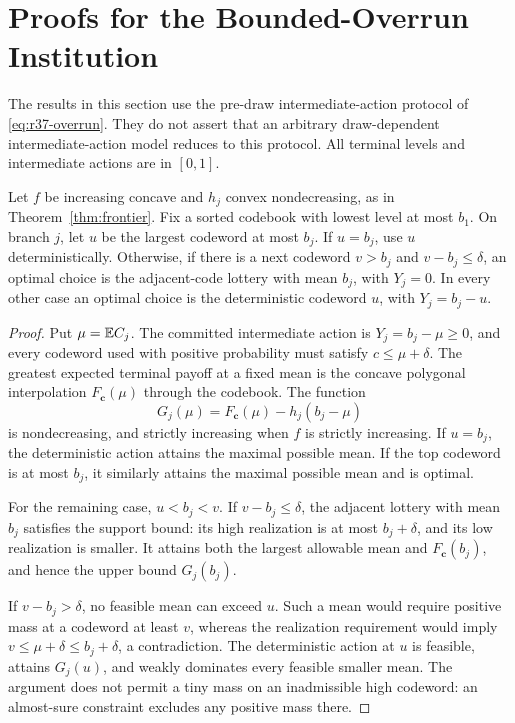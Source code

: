 \section{Proofs for the Bounded-Overrun Institution}\label{ec:r37-overrun}
The results in this section use the pre-draw intermediate-action protocol of \eqref{eq:r37-overrun}. They do not assert that an arbitrary draw-dependent intermediate-action model reduces to this protocol. All terminal levels and intermediate actions are in $[0,1]$.

\begin{proposition}\label{prop:r37-fixed-overrun}
Let $f$ be increasing concave and $h_j$ convex nondecreasing, as in Theorem~\ref{thm:frontier}. Fix a sorted codebook with lowest level at most $b_1$. On branch $j$, let $u$ be the largest codeword at most $b_j$. If $u=b_j$, use $u$ deterministically. Otherwise, if there is a next codeword $v>b_j$ and $v-b_j\leq\delta$, an optimal choice is the adjacent-code lottery with mean $b_j$, with $Y_j=0$. In every other case an optimal choice is the deterministic codeword $u$, with $Y_j=b_j-u$.
\end{proposition}
\begin{proof}
Put $\mu=\mathbb E C_j$. The committed intermediate action is $Y_j=b_j-\mu\geq0$, and every codeword used with positive probability must satisfy $c\leq\mu+\delta$. The greatest expected terminal payoff at a fixed mean is the concave polygonal interpolation $F_{\boldsymbol c}(\mu)$ through the codebook. The function
\[
 G_j(\mu)=F_{\boldsymbol c}(\mu)-h_j(b_j-\mu)
\]
is nondecreasing, and strictly increasing when $f$ is strictly increasing. If $u=b_j$, the deterministic action attains the maximal possible mean. If the top codeword is at most $b_j$, it similarly attains the maximal possible mean and is optimal.

For the remaining case, $u<b_j<v$. If $v-b_j\leq\delta$, the adjacent lottery with mean $b_j$ satisfies the support bound: its high realization is at most $b_j+\delta$, and its low realization is smaller. It attains both the largest allowable mean and $F_{\boldsymbol c}(b_j)$, and hence the upper bound $G_j(b_j)$.

If $v-b_j>\delta$, no feasible mean can exceed $u$. Such a mean would require positive mass at a codeword at least $v$, whereas the realization requirement would imply $v\leq\mu+\delta\leq b_j+\delta$, a contradiction. The deterministic action at $u$ is feasible, attains $G_j(u)$, and weakly dominates every feasible smaller mean. The argument does not permit a tiny mass on an inadmissible high codeword: an almost-sure constraint excludes any positive mass there.
\end{proof}

